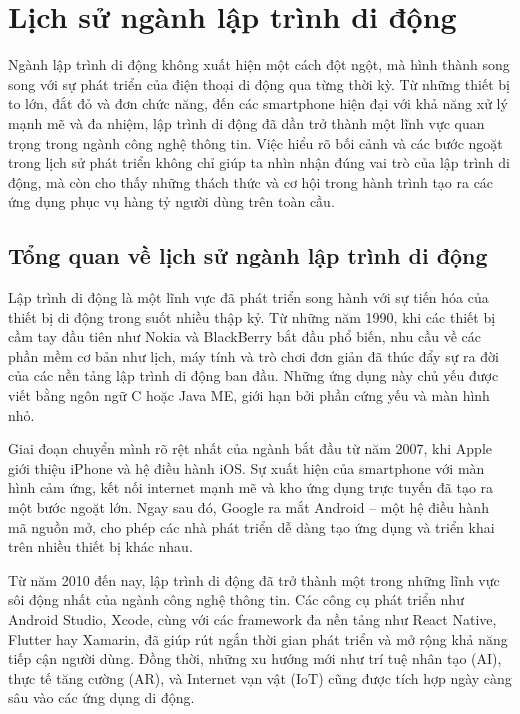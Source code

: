 \section{Lịch sử ngành lập trình di động}
\begin{flushleft}
  \hspace*{0.8cm}Ngành lập trình di động không xuất hiện một cách đột ngột, mà hình thành song song với sự phát triển của điện thoại di động qua từng thời kỳ. Từ những thiết bị to lớn, đắt đỏ và đơn chức năng, đến các smartphone hiện đại với khả năng xử lý mạnh mẽ và đa nhiệm, lập trình di động đã dần trở thành một lĩnh vực quan trọng trong ngành công nghệ thông tin. Việc hiểu rõ bối cảnh và các bước ngoặt trong lịch sử phát triển không chỉ giúp ta nhìn nhận đúng vai trò của lập trình di động, mà còn cho thấy những thách thức và cơ hội trong hành trình tạo ra các ứng dụng phục vụ hàng tỷ người dùng trên toàn cầu.
\end{flushleft}
\subsection{Tổng quan về lịch sử ngành lập trình di động}
\renewcommand{\labelitemi}{--}  

\begin{flushleft}
  \hspace*{0.8cm}Lập trình di động là một lĩnh vực đã phát triển song hành với sự tiến hóa của thiết bị di động trong suốt nhiều thập kỷ. Từ những năm 1990, khi các thiết bị cầm tay đầu tiên như Nokia và BlackBerry bắt đầu phổ biến, nhu cầu về các phần mềm cơ bản như lịch, máy tính và trò chơi đơn giản đã thúc đẩy sự ra đời của các nền tảng lập trình di động ban đầu. Những ứng dụng này chủ yếu được viết bằng ngôn ngữ C hoặc Java ME, giới hạn bởi phần cứng yếu và màn hình nhỏ.
\end{flushleft}

\begin{flushleft}
  \hspace*{0.8cm}Giai đoạn chuyển mình rõ rệt nhất của ngành bắt đầu từ năm 2007, khi Apple giới thiệu iPhone và hệ điều hành iOS. Sự xuất hiện của smartphone với màn hình cảm ứng, kết nối internet mạnh mẽ và kho ứng dụng trực tuyến đã tạo ra một bước ngoặt lớn. Ngay sau đó, Google ra mắt Android – một hệ điều hành mã nguồn mở, cho phép các nhà phát triển dễ dàng tạo ứng dụng và triển khai trên nhiều thiết bị khác nhau.
\end{flushleft}

\begin{flushleft}
  \hspace*{0.8cm}Từ năm 2010 đến nay, lập trình di động đã trở thành một trong những lĩnh vực sôi động nhất của ngành công nghệ thông tin. Các công cụ phát triển như Android Studio, Xcode, cùng với các framework đa nền tảng như React Native, Flutter hay Xamarin, đã giúp rút ngắn thời gian phát triển và mở rộng khả năng tiếp cận người dùng. Đồng thời, những xu hướng mới như trí tuệ nhân tạo (AI), thực tế tăng cường (AR), và Internet vạn vật (IoT) cũng được tích hợp ngày càng sâu vào các ứng dụng di động.
\end{flushleft}

